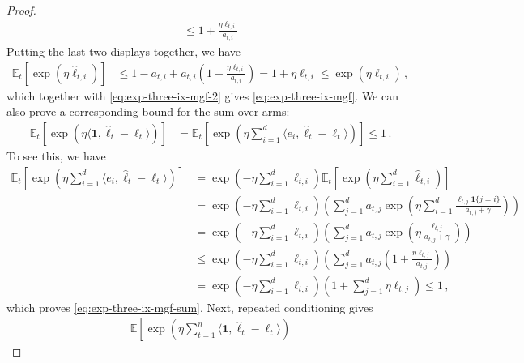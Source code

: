 \documentclass{article}
\theoremstyle{plain}
\theoremstyle{definition}
\newcommand{\E}{\mathbb E}
\newcommand{\hl}{\hat{\ell}\xspace}
\begin{document}
\begin{proof}[Proof]
\begin{align}
        \leq 1 + \frac{\eta \ell_{t,i}}{a_{t,i}}
        \label{eq:exp-three-ix-mgf-scaler-ineq}
    \end{align}
    Putting the last two displays together, we have
    \begin{align*}
        \E_t[\exp(\eta \hl_{t,i})]
         & \leq 1 - a_{t,i} + a_{t,i}\left(1 + \frac{\eta \ell_{t,i}}{a_{t,i}}\right)
        = 1 + \eta \ell_{t,i}
        \leq \exp(\eta \ell_{t,i})\,,
    \end{align*}
    which together with \cref{eq:exp-three-ix-mgf-2} gives \cref{eq:exp-three-ix-mgf}.
    We can also prove a corresponding bound for the sum over arms:
    \begin{align}
        \E_t[\exp(\eta \langle \mathbf{1}, \hl_t - \ell_t\rangle)]
         & =
        \E_t[\exp(\eta \sum_{i=1}^d \langle e_i, \hl_t - \ell_t\rangle)]
        \leq 1\,.
        \label{eq:exp-three-ix-mgf-sum}
    \end{align}
    To see this, we have
    \begin{align*}
        \E_t\left[\exp(\eta \sum_{i=1}^d \langle e_i, \hl_t - \ell_t\rangle)\right]
         & =
        \exp\left(
        - \eta \sum_{i=1}^d \ell_{t,i}
        \right)
        \E_t\left[\exp\left(\eta \sum_{i=1}^d \hl_{t,i}\right)\right]
        \\
         & =
        \exp\left(
        - \eta \sum_{i=1}^d \ell_{t,i}
        \right)
        \left(\sum_{j=1}^d a_{t,j} \exp\left(\eta \sum_{i=1}^d \frac{\ell_{t,j} \mathbf{1}\{j=i\}}{a_{t,j} + \gamma}\right)\right)
        \\
         & =
        \exp\left(
        - \eta \sum_{i=1}^d \ell_{t,i}
        \right)
        \left(\sum_{j=1}^d a_{t,j} \exp\left(\eta \frac{\ell_{t,j}}{a_{t,j} + \gamma}\right)\right)
        \\
         & \leq
        \exp\left(
        - \eta \sum_{i=1}^d \ell_{t,i}
        \right)
        \left(\sum_{j=1}^d a_{t,j} \left(1 + \frac{\eta \ell_{t,j}}{a_{t,j}}\right)\right)
        \\
         & =
        \exp\left(
        - \eta \sum_{i=1}^d \ell_{t,i}
        \right)
        \left(1 + \sum_{j=1}^d \eta \ell_{t,j}\right)
        \leq 1\,,
    \end{align*}
    which proves \eqref{eq:exp-three-ix-mgf-sum}.
    Next, repeated conditioning gives
    \begin{align*}
        \E\left[
            \exp\left(
            \eta \sum_{t=1}^{n}
            \langle \mathbf{1}, \hl_t - \ell_t \rangle
            \right)

\end{align*}
\end{proof}
\end{document}
